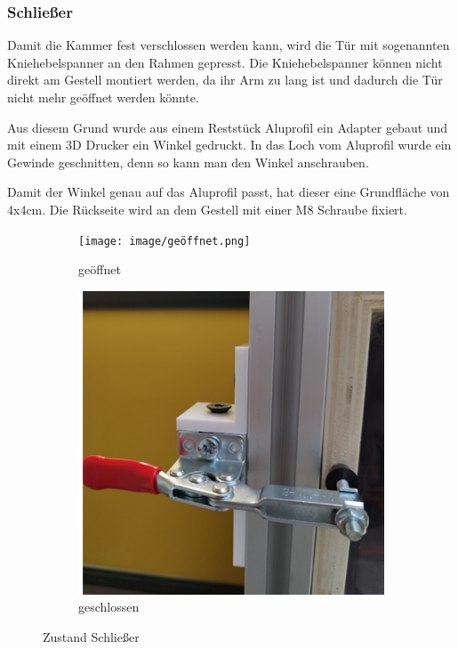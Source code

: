 \subsubsection{Schließer}
Damit die Kammer fest verschlossen werden kann, wird die Tür mit sogenannten Kniehebelspanner an den Rahmen gepresst.
Die Kniehebelspanner können nicht direkt am Gestell montiert werden, da ihr Arm zu lang ist und dadurch die Tür nicht mehr geöffnet werden könnte.
\begin{figwindow}
Aus diesem Grund wurde aus einem Reststück Aluprofil ein Adapter gebaut und mit einem 3D Drucker ein Winkel gedruckt. In das Loch vom Aluprofil wurde ein Gewinde geschnitten, denn so kann man den Winkel anschrauben.
\end{figwindow}
\vspace{20mm}
\begin{figwindow}
Damit der Winkel genau auf das Aluprofil passt, hat dieser eine Grundfläche von 4x4cm. Die Rückseite wird an dem Gestell mit einer M8 Schraube fixiert.
\end{figwindow}
\vspace{40mm}
\begin{figure}[H]
    \centering
    \begin{subfigure}[b]{0.3\textwidth}
        \centering
        \texttt{[image: image/geöffnet.png]}
        \caption{geöffnet}
        \label{fig:bild1}
    \end{subfigure}
    \hfill
    \begin{subfigure}[b]{0.35\textwidth}
        \centering
        \includegraphics[width=\textwidth]{image/geschlossen.png}
        \caption{geschlossen}
        \label{fig:bild2}
    \end{subfigure}
    \caption{Zustand Schließer}
    \label{fig:zwei_bilder}
\end{figure}